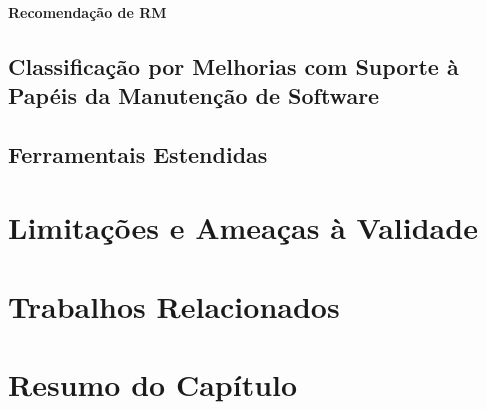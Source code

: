\paragraph{Recomendação de RM}

\subsection{Classificação por Melhorias com Suporte à Papéis da Manutenção de
	Software}
\label{sub:extensões_com_suporte_a_papeis}

\subsection{Ferramentais Estendidas}
\label{sub:ferrramentas_extendidas}

\section{Limitações e Ameaças à Validade}

\section{Trabalhos Relacionados}

\section{Resumo do Capítulo}